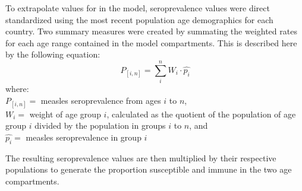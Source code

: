 \documentclass[../Paper.tex]{subfiles}
\begin{document}
To extrapolate values for in the model, seroprevalence values were direct standardized
using the most recent population age demographics for each country. Two summary
measures were created by summating the weighted rates for each age range
contained in the model compartments. This is described here by the following
equation:
  \begin{equation}
    P_{[i,n]} =\sum_{i}^{n}W_{i}\cdot \widehat{p_{i}}
  \end{equation}
  where:\\
  $P_{[i,n]} =$ measles seroprevalence from ages $i$ to $n$, \\
  $W_{i} =$ weight of age group $i$, calculated as the quotient of the population
  of age group $i$ divided by the population in groups $i$ to $n$, and \\
  $\widehat{p_{i}} =$ measles seroprevalence in group $i$

The resulting seroprevalence values are then multiplied by their respective
populations to generate the proportion susceptible and immune in the two age
compartments.


\clearpage
\end{document}
